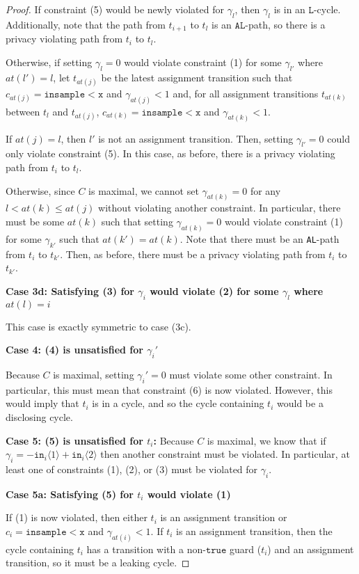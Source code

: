 \documentclass[12pt]{article}
\newcommand{\lguard}[1][x]{\texttt{insample} < #1}
\newcommand{\brangle}[1]{\langle #1 \rangle}
\theoremstyle{definition}
\begin{document}
\begin{proof}
    If constraint (5) would be newly violated for $\gamma_l$, then $\gamma_l$ is in an $\texttt{L}$-cycle. Additionally, note that the path from $t_{i+1}$ to $t_l$ is an $\texttt{AL}$-path, so there is a privacy violating path from $t_i$ to $t_l$. 

    Otherwise, if setting $\gamma_l = 0$ would violate constraint (1) for some $\gamma_{l'}$ where $at(l')=l$, let $t_{at(j)}$ be the latest assignment transition such that $c_{at(j)} = \lguard[\texttt{x}]$ and $\gamma_{at(j)}<1$ and, for all assignment transitions $t_{at(k)}$ between $t_l$ and $t_{at(j)}$, $c_{at(k)} = \lguard[\texttt{x}]$ and $\gamma_{at(k)}<1$. 

    If $at(j) = l$, then $l'$ is not an assignment transition. Then, setting $\gamma_{l'} = 0$ could only violate constraint (5). In this case, as before, there is a privacy violating path from $t_i$ to $t_l$. 

    Otherwise, since $C$ is maximal, we cannot set $\gamma_{at(k)}=0$ for any $l<at(k)\leq at(j)$ without violating another constraint. In particular, there must be some $at(k)$ such that setting $\gamma_{at(k)} = 0$ would violate constraint (1) for some $\gamma_{k'}$ such that $at(k') = at(k)$. Note that there must be an \texttt{AL}-path from $t_i$ to $t_{k'}$. Then, as before, there must be a privacy violating path from $t_i$ to $t_{k'}$. 


    \textbf{Case 3d: Satisfying (3) for $\gamma_i$ would violate (2) for some $\gamma_l$ where $at(l) = i$} 

    This case is exactly symmetric to case (3c).

    \textbf{Case 4: (4) is unsatisfied for $\gamma_i'$}
    
    Because $C$ is maximal, setting $\gamma_i'=0$ must violate some other constraint. In particular, this must mean that constraint (6) is now violated. However, this would imply that $t_i$ is in a cycle, and so the cycle containing $t_i$ would be a disclosing cycle.

    \textbf{Case 5: (5) is unsatisfied for $t_i$:} Because $C$ is maximal, we know that if $\gamma_i = -\texttt{in}_i\brangle{1}+\texttt{in}_i\brangle{2}$ then another constraint must be violated. In particular, at least one of constraints (1), (2), or (3) must be violated for $\gamma_i$. 
    
    \textbf{Case 5a: Satisfying (5) for $t_i$ would violate (1)}

    If (1) is now violated, then either $t_i$ is an assignment transition or $c_i = \lguard[\texttt{x}]$ and $\gamma_{at(i)}<1$. If $t_i$ is an assignment transition, then the cycle containing $t_i$ has a transition with a non-$\texttt{true}$ guard ($t_i$) and an assignment transition, so it must be a leaking cycle. 


\end{proof}
\end{document}
